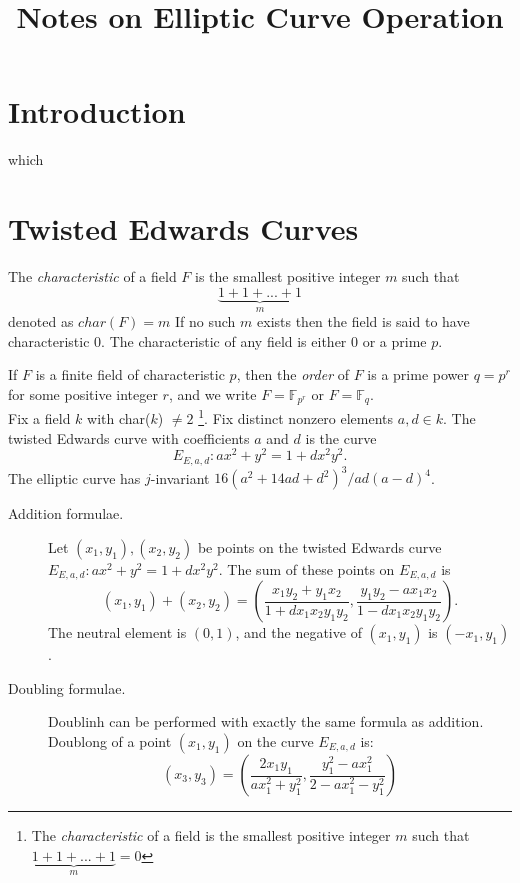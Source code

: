 \documentclass[a4paper]{article}
\title{Notes on Elliptic Curve Operation}
\author{}
\date{}
\begin{document}
\maketitle


\section{Introduction}
which 

\section{Twisted Edwards Curves}

The \textit{characteristic} of a field $F$ is the smallest positive integer $m$ such that
$$\underbrace{1+1+...+1}_{m}$$
denoted as $char(F)=m$
If no such $m$ exists then the field is said to have characteristic 0. The characteristic of any field is
either 0 or a prime $p$.

If $F$ is a finite field of characteristic $p$, then the \textit{order} of $F$ is a prime power $q=p^r$ for some positive integer $r$, and we write $F = \mathbb{F}_{p^r}$ or $F = \mathbb{F}_q$. \\

Fix a field $k$ with char($k$) $\neq 2$ \footnote{The \textit{characteristic} of a field is the smallest positive integer $m$ such that $\underbrace{1+1+...+1}_{m}=0$}. Fix distinct nonzero elements $a,d \in k$. The twisted Edwards curve with coefficients $a$ and $d$ is the curve
$$E_{E,a,d}:ax^2+y^2=1+dx^2y^2.$$
The elliptic curve has $j$-invariant $16(a^2+14ad+d^2)^3/ad(a-d)^4$.
\begin{description}
\item[Addition formulae.] Let $(x_1,y_1),(x_2,y_2)$ be points on the twisted Edwards curve $E_{E,a,d}:ax^2+y^2=1+dx^2y^2$. The sum of these points on $E_{E,a,d}$ is
$$(x_1,y_1)+(x_2,y_2)=\left(\frac{x_1y_2+y_1x_2}{1+dx_1x_2y_1y_2},\frac{y_1y_2-ax_1x_2}{1-dx_1x_2y_1y_2} \right).$$
The neutral element is $(0,1)$, and the negative of $(x_1,y_1)$ is $(-x_1,y_1)$.
\end{description}

\begin{description}
\item[Doubling formulae.] Doublinh can be performed with exactly the same formula as addition. Doublong of a point $(x_1,y_1)$ on the curve $E_{E,a,d}$ is:
$$(x_3,y_3)=\left(\frac{2x_1y_1}{ax_1^2+y_1^2},\frac{y_1^2-ax_1^2}{2-ax_1^2-y_1^2} \right)$$

\end{description}
\end{document}

